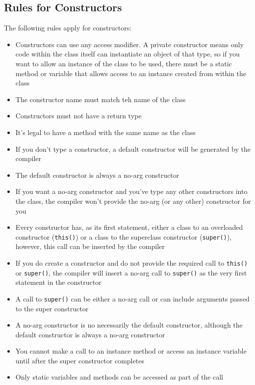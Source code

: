 \subsection{Rules for Constructors}
The following rules apply for constructors:
\begin{itemize}
    \item Constructors can use any access modifier. A private constructor means 
    only code within the class itself can instantiate an object of that type, 
    so if you want to allow an instance of the class to be used, there must be 
    a static method or variable that allows access to an instance created from 
    within the class
    \item The constructor name must match teh name of the class
    \item Constructors must not have a return type
    \item It's legal to have a method with the same name as the class
    \item If you don't type a constructor, a default constructor will be 
    generated by the compiler
    \item The default constructor is always a no-arg constructor
    \item If you want a no-arg constructor and you've type any other 
    constructors into the class, the compiler won't provide the no-arg (or any 
    other) constructor for you
    \item Every constructor has, as its first statement, either a class to an 
    overloaded constructor (\verb#this()#) or a class to the superclass 
    constructor (\verb#super()#), however, this call can be inserted by the
    compiler
    \item If you do create a constructor and do not provide the required call 
    to \verb#this()# or \verb#super()#, the compiler will insert a no-arg call 
    to \verb#super()# as the very first statement in the constructor
    \item A call to \verb#super()# can be either a no-arg call or can include 
    arguments passed to the super constructor
    \item A no-arg constructor is no necessarily the default constructor, 
    although the default constructor is always a no-arg constructor
    \item You cannot make a call to an instance method or access an instance 
    variable until after the super constructor completes
    \item Only static variables and methods can be accessed as part of the call 

\end{itemize}
